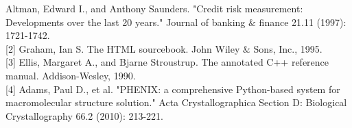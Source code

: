  \begin{flushleft}
[1] Altman, Edward I., and Anthony Saunders. "Credit risk measurement: Developments over the last 20 years." Journal of banking $\&$ finance 21.11 (1997): 1721-1742. \\

[2] Graham, Ian S. The HTML sourcebook. John Wiley $\&$ Sons, Inc., 1995.\\

[3] Ellis, Margaret A., and Bjarne Stroustrup. The annotated C++ reference manual. Addison-Wesley, 1990.\\

[4] Adams, Paul D., et al. "PHENIX: a comprehensive Python-based system for macromolecular structure solution." Acta Crystallographica Section D: Biological Crystallography 66.2 (2010): 213-221.\\
\end{flushleft}
% 
% 